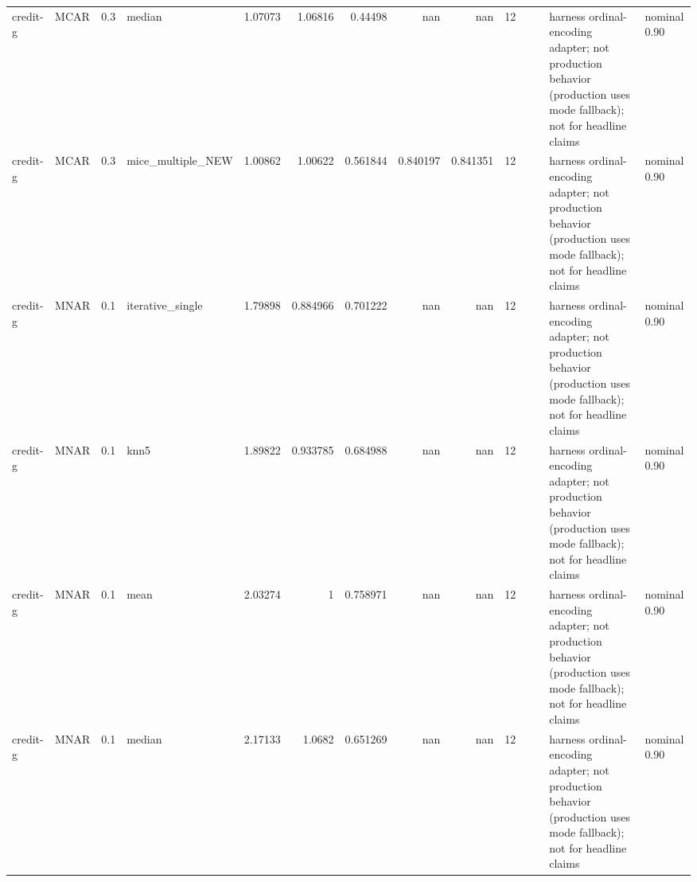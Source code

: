 \begin{table}[ht]
\begin{tabular}{llrlrrrrrrllll}
 credit-g             & MCAR        &         0.3 & median            &       1.07073  &             1.06816  &                 0.44498  &                     nan        &                       nan        &        12 &                    &                                         & harness ordinal-encoding adapter; not production behavior (production uses mode fallback); not for headline claims & nominal 0.90              \\
 credit-g             & MCAR        &         0.3 & mice\_multiple\_NEW &       1.00862  &             1.00622  &                 0.561844 &                       0.840197 &                         0.841351 &        12 &                    &                                         & harness ordinal-encoding adapter; not production behavior (production uses mode fallback); not for headline claims & nominal 0.90              \\
 credit-g             & MNAR        &         0.1 & iterative\_single  &       1.79898  &             0.884966 &                 0.701222 &                     nan        &                       nan        &        12 &                    &                                         & harness ordinal-encoding adapter; not production behavior (production uses mode fallback); not for headline claims & nominal 0.90              \\
 credit-g             & MNAR        &         0.1 & knn5              &       1.89822  &             0.933785 &                 0.684988 &                     nan        &                       nan        &        12 &                    &                                         & harness ordinal-encoding adapter; not production behavior (production uses mode fallback); not for headline claims & nominal 0.90              \\
 credit-g             & MNAR        &         0.1 & mean              &       2.03274  &             1        &                 0.758971 &                     nan        &                       nan        &        12 &                    &                                         & harness ordinal-encoding adapter; not production behavior (production uses mode fallback); not for headline claims & nominal 0.90              \\
 credit-g             & MNAR        &         0.1 & median            &       2.17133  &             1.0682   &                 0.651269 &                     nan        &                       nan        &        12 &                    &                                         & harness ordinal-encoding adapter; not production behavior (production uses mode fallback); not for headline claims & nominal 0.90              \\

\end{tabular}
\end{table}
